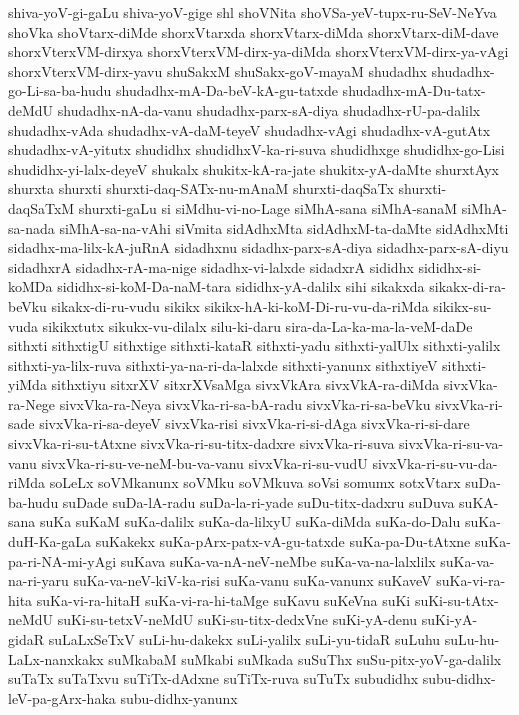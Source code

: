 {shiva-yoV-gi-gaLu
shiva-yoV-gige
shl
shoVNita
shoVSa-yeV-tupx-ru-SeV-NeYva
shoVka
shoVtarx-diMde
shorxVtarxda
shorxVtarx-diMda
shorxVtarx-diM-dave
shorxVterxVM-dirxya
shorxVterxVM-dirx-ya-diMda
shorxVterxVM-dirx-ya-vAgi
shorxVterxVM-dirx-yavu
shuSakxM
shuSakx-goV-mayaM
shudadhx
shudadhx-go-Li-sa-ba-hudu
shudadhx-mA-Da-beV-kA-gu-tatxde
shudadhx-mA-Du-tatx-deMdU
shudadhx-nA-da-vanu
shudadhx-parx-sA-diya
shudadhx-rU-pa-dalilx
shudadhx-vAda
shudadhx-vA-daM-teyeV
shudadhx-vAgi
shudadhx-vA-gutAtx
shudadhx-vA-yitutx
shudidhx
shudidhxV-ka-ri-suva
shudidhxge
shudidhx-go-Lisi
shudidhx-yi-lalx-deyeV
shukalx
shukitx-kA-ra-jate
shukitx-yA-daMte
shurxtAyx
shurxta
shurxti
shurxti-daq-SATx-nu-mAnaM
shurxti-daqSaTx
shurxti-daqSaTxM
shurxti-gaLu
si
siMdhu-vi-no-Lage
siMhA-sana
siMhA-sanaM
siMhA-sa-nada
siMhA-sa-na-vAhi
siVmita
sidAdhxMta
sidAdhxM-ta-daMte
sidAdhxMti
sidadhx-ma-lilx-kA-juRnA
sidadhxnu
sidadhx-parx-sA-diya
sidadhx-parx-sA-diyu
sidadhxrA
sidadhx-rA-ma-nige
sidadhx-vi-lalxde
sidadxrA
sididhx
sididhx-si-koMDa
sididhx-si-koM-Da-naM-tara
sididhx-yA-dalilx
sihi
sikakxda
sikakx-di-ra-beVku
sikakx-di-ru-vudu
sikikx
sikikx-hA-ki-koM-Di-ru-vu-da-riMda
sikikx-su-vuda
sikikxtutx
sikukx-vu-dilalx
silu-ki-daru
sira-da-La-ka-ma-la-veM-daDe
sithxti
sithxtigU
sithxtige
sithxti-kataR
sithxti-yadu
sithxti-yalUlx
sithxti-yalilx
sithxti-ya-lilx-ruva
sithxti-ya-na-ri-da-lalxde
sithxti-yanunx
sithxtiyeV
sithxti-yiMda
sithxtiyu
sitxrXV
sitxrXVsaMga
sivxVkAra
sivxVkA-ra-diMda
sivxVka-ra-Nege
sivxVka-ra-Neya
sivxVka-ri-sa-bA-radu
sivxVka-ri-sa-beVku
sivxVka-ri-sade
sivxVka-ri-sa-deyeV
sivxVka-risi
sivxVka-ri-si-dAga
sivxVka-ri-si-dare
sivxVka-ri-su-tAtxne
sivxVka-ri-su-titx-dadxre
sivxVka-ri-suva
sivxVka-ri-su-va-vanu
sivxVka-ri-su-ve-neM-bu-va-vanu
sivxVka-ri-su-vudU
sivxVka-ri-su-vu-da-riMda
soLeLx
soVMkanunx
soVMku
soVMkuva
soVsi
somumx
sotxVtarx
suDa-ba-hudu
suDade
suDa-lA-radu
suDa-la-ri-yade
suDu-titx-dadxru
suDuva
suKA-sana
suKa
suKaM
suKa-dalilx
suKa-da-lilxyU
suKa-diMda
suKa-do-Dalu
suKa-duH-Ka-gaLa
suKakekx
suKa-pArx-patx-vA-gu-tatxde
suKa-pa-Du-tAtxne
suKa-pa-ri-NA-mi-yAgi
suKava
suKa-va-nA-neV-neMbe
suKa-va-na-lalxlilx
suKa-va-na-ri-yaru
suKa-va-neV-kiV-ka-risi
suKa-vanu
suKa-vanunx
suKaveV
suKa-vi-ra-hita
suKa-vi-ra-hitaH
suKa-vi-ra-hi-taMge
suKavu
suKeVna
suKi
suKi-su-tAtx-neMdU
suKi-su-tetxV-neMdU
suKi-su-titx-dedxVne
suKi-yA-denu
suKi-yA-gidaR
suLaLxSeTxV
suLi-hu-dakekx
suLi-yalilx
suLi-yu-tidaR
suLuhu
suLu-hu-LaLx-nanxkakx
suMkabaM
suMkabi
suMkada
suSuThx
suSu-pitx-yoV-ga-dalilx
suTaTx
suTaTxvu
suTiTx-dAdxne
suTiTx-ruva
suTuTx
subudidhx
subu-didhx-leV-pa-gArx-haka
subu-didhx-yanunx
}
